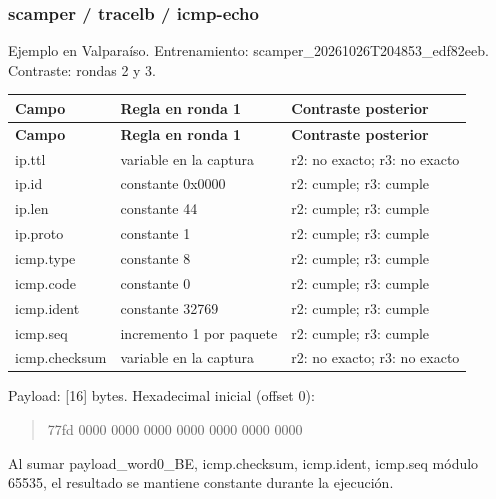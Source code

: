 \subsubsection{scamper / tracelb / icmp-echo}
Ejemplo en Valparaíso. Entrenamiento: scamper\_\allowbreak{}20261026T204853\_\allowbreak{}edf82eeb. Contraste: rondas 2 y 3. 

\begingroup
\fontsize{9}{11}\selectfont
\addtocounter{table}{-1}
\begin{longtable}{p{3.1cm}p{5.8cm}p{5.1cm}}
\toprule
\textbf{Campo} & \textbf{Regla en ronda 1} & \textbf{Contraste posterior} \\ \midrule
\endfirsthead
\toprule
\textbf{Campo} & \textbf{Regla en ronda 1} & \textbf{Contraste posterior} \\ \midrule
\endhead
ip.ttl & variable en la captura & r2: no exacto; r3: no exacto \\
ip.id & constante 0x0000 & r2: cumple; r3: cumple \\
ip.len & constante 44 & r2: cumple; r3: cumple \\
ip.proto & constante 1 & r2: cumple; r3: cumple \\
icmp.type & constante 8 & r2: cumple; r3: cumple \\
icmp.code & constante 0 & r2: cumple; r3: cumple \\
icmp.ident & constante 32769 & r2: cumple; r3: cumple \\
icmp.seq & incremento 1 por paquete & r2: cumple; r3: cumple \\
icmp.checksum & variable en la captura & r2: no exacto; r3: no exacto \\
\bottomrule
\end{longtable}
\endgroup
Payload: [16] bytes. Hexadecimal inicial (offset 0):

\begin{quote}\ttfamily\footnotesize\raggedright 77fd 0000 0000 0000 0000 0000 0000 0000\end{quote}

Al sumar payload\_\allowbreak{}word0\_\allowbreak{}BE, icmp.checksum, icmp.ident, icmp.seq módulo 65535, el resultado se mantiene constante durante la ejecución.

